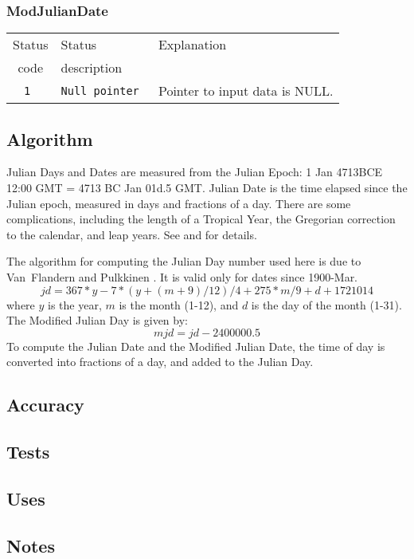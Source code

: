 \subsubsection{ModJulianDate}
\begin{tabular}{|c|l|l|}
  \hline
  Status & Status       & Explanation \\
  code   & description  &             \\
  \hline
  \tt 1  & \tt Null pointer & Pointer to input data is NULL. \\
  \hline
\end{tabular}

\subsection{Algorithm}

Julian Days and Dates are measured from the Julian Epoch: 1 Jan 4713BCE
12:00 GMT = 4713 BC Jan 01d.5 GMT.  Julian Date is the time elapsed since
the Julian epoch, measured in days and fractions of a day.  There are some
complications, including the length of a Tropical Year, the Gregorian
correction to the calendar, and leap years. See \cite{green:1985} and
\cite{esaa:1992} for details.

The algorithm for computing the Julian Day number used here is due to
Van~Flandern and Pulkkinen \cite{vfp:1979}.  It is valid only for dates
since 1900-Mar.
%
\begin{equation}
  jd = 367 * y - 7 * (y + (m + 9)/12)/4 + 275 * m/9 + d + 1721014
\end{equation}
%
where $y$ is the year, $m$ is the month (1-12), and $d$ is the day of the
month (1-31).  The Modified Julian Day is given by:
%
\begin{equation}
  mjd = jd - 2400000.5
\end{equation}
%
To compute the Julian Date and the Modified Julian Date, the time of day is
converted into fractions of a day, and added to the Julian Day.


\subsection{Accuracy}

\subsection{Tests}

\subsection{Uses}


\subsection{Notes}


  





